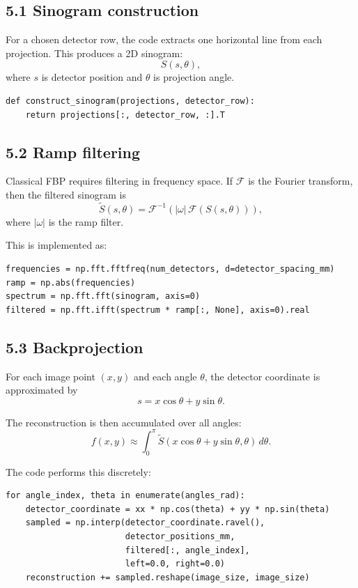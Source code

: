 \documentclass[12pt,a4paper]{article}
\begin{document}
\subsection*{5.1 Sinogram construction}
For a chosen detector row, the code extracts one horizontal line from each projection. This produces a 2D sinogram:
\[
S(s,\theta),
\]
where $s$ is detector position and $\theta$ is projection angle.

\begin{lstlisting}[style=py,caption={Constructing a sinogram from a detector row}]
def construct_sinogram(projections, detector_row):
    return projections[:, detector_row, :].T
\end{lstlisting}

\subsection*{5.2 Ramp filtering}
Classical FBP requires filtering in frequency space. If $\mathcal{F}$ is the Fourier transform, then the filtered sinogram is
\[
\tilde{S}(s,\theta) = \mathcal{F}^{-1}\left( |\omega| \, \mathcal{F}(S(s,\theta)) \right),
\]
where $|\omega|$ is the ramp filter.

This is implemented as:
\begin{lstlisting}[style=py,caption={Ramp filter implementation}]
frequencies = np.fft.fftfreq(num_detectors, d=detector_spacing_mm)
ramp = np.abs(frequencies)
spectrum = np.fft.fft(sinogram, axis=0)
filtered = np.fft.ifft(spectrum * ramp[:, None], axis=0).real
\end{lstlisting}

\subsection*{5.3 Backprojection}
For each image point $(x,y)$ and each angle $\theta$, the detector coordinate is approximated by
\[
s = x\cos\theta + y\sin\theta.
\]

The reconstruction is then accumulated over all angles:
\[
f(x,y) \approx \int_0^\pi \tilde{S}(x\cos\theta + y\sin\theta,\theta)\, d\theta.
\]

The code performs this discretely:
\begin{lstlisting}[style=py,caption={Discrete backprojection loop}]
for angle_index, theta in enumerate(angles_rad):
    detector_coordinate = xx * np.cos(theta) + yy * np.sin(theta)
    sampled = np.interp(detector_coordinate.ravel(),
                        detector_positions_mm,
                        filtered[:, angle_index],
                        left=0.0, right=0.0)
    reconstruction += sampled.reshape(image_size, image_size)
\end{lstlisting}
\end{document}
